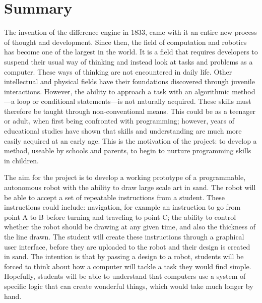 
\chapter{Summary}\label{summary}\label{section \thechapter}
\glsresetall


\label{summary: why}\label{summary: introduction}
The invention of the difference engine in 1833, came with it an entire new process of thought and development. Since then, the field of computation and robotics has become one of the largest in the world. It is a field that requires developers to suspend their usual way of thinking and instead look at tasks and problems as a computer. These ways of thinking are not encountered in daily life. Other intellectual and physical fields have their foundations discovered through juvenile interactions. However, the ability to approach a task with an algorithmic method---a loop or conditional statements---is not naturally acquired. These skills must therefore be taught through non-conventional means. This could be as a teenager or adult, when first being confronted with programming; however, years of educational studies have shown that skills and understanding are much more easily acquired at an early age. This is the motivation of the \SandE project: to develop a method, useable by schools and parents, to begin to nurture programming skills in children.

The aim for the \SandE project is to develop a working prototype of a programmable, autonomous robot with the ability to draw large scale art in sand. The robot will be able to accept a set of repeatable instructions from a student. These instructions could include: navigation, for example an instruction to go from point A to B before turning and traveling to point C; the ability to control whether the robot should be drawing at any given time, and also the thickness of the line drawn. The student will create these instructions through a graphical user interface, before they are uploaded to the robot and their design is created in sand. The intention is that by passing a design to a robot, students will be forced to think about how a computer will tackle a task they would find simple. Hopefully, students will be able to understand that computers use a system of specific logic that can create wonderful things, which would take much longer by hand.

